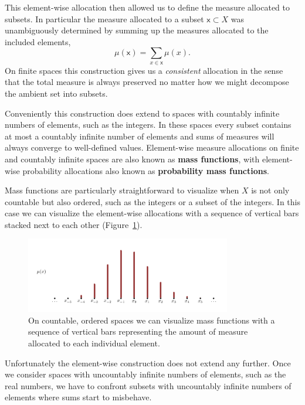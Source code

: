 \documentclass[
  letterpaper,
  DIV=11,
  numbers=noendperiod]{scrartcl}
\begin{document}
This element-wise allocation then allowed us to define the measure
allocated to subsets. In particular the measure allocated to a subset
\(\mathsf{x} \subset X\) was unambiguously determined by summing up the
measures allocated to the included elements, \[
\mu(\mathsf{x}) = \sum_{x \in \mathsf{x}} \mu(x).
\] On finite spaces this construction gives us a \emph{consistent}
allocation in the sense that the total measure is always preserved no
matter how we might decompose the ambient set into subsets.

Conveniently this construction does extend to spaces with countably
infinite numbers of elements, such as the integers. In these spaces
every subset contains at most a countably infinite number of elements
and sums of measures will always converge to well-defined values.
Element-wise measure allocations on finite and countably infinite spaces
are also known as \textbf{mass functions}, with element-wise probability
allocations also known as \textbf{probability mass functions}.

Mass functions are particularly straightforward to visualize when \(X\)
is not only countable but also ordered, such as the integers or a subset
of the integers. In this case we can visualize the element-wise
allocations with a sequence of vertical bars stacked next to each other
(Figure~\ref{fig-mass-function}).

\begin{figure}

{\centering \includegraphics[width=0.8\textwidth,height=\textheight]{figures/mass_function/mass_function.pdf}

}

\caption{\label{fig-mass-function}On countable, ordered spaces we can
visualize mass functions with a sequence of vertical bars representing
the amount of measure allocated to each individual element.}

\end{figure}

Unfortunately the element-wise construction does not extend any further.
Once we consider spaces with uncountably infinite numbers of elements,
such as the real numbers, we have to confront subsets with uncountably
infinite numbers of elements where sums start to misbehave.
\end{document}
